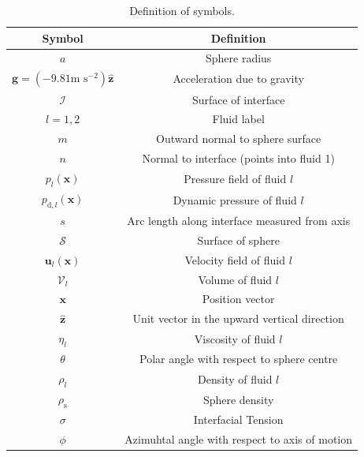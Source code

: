 \documentclass[12pt]{article}
\begin{document}
    \begin{longtable}{|c|c|}
    \caption{Definition of symbols. \label{tab:symbols}} \\ %
    \hline
    Symbol & Definition \\  
    \hline %
    $a$                                                    & Sphere radius           \\
    $\mathbf{g} = (-9.81 \text{m s}^{-2}) \mathbf{\hat{z}}$ & Acceleration due to gravity \\      
    $\mathcal{I}$                                          & Surface of interface \\
    $l = 1,2$                                              & Fluid label \\
    $m$                                                    & Outward normal to sphere surface \\
    $n$                                                    & Normal to interface (points into fluid 1) \\
    $p_{l}(\mathbf{x})$                                     & Pressure field of fluid $l$ \\
    $p_{\text{d},l}(\mathbf{x}) $                             & Dynamic pressure of fluid $l$ \\
    $s$                                                    & Arc length along interface measured from axis \\
    $\mathcal{S}$                                          & Surface of sphere \\
    $\mathbf{u}_{l}(\mathbf{x})$                            & Velocity field of fluid $l$ \\
    $\mathcal{V}_{l}$                                       & Volume of fluid $l$ \\
    $\mathbf{x}$                                           & Position vector \\
    $\mathbf{\hat{z}}$                                     & Unit vector in the upward vertical direction \\
    $\eta_{l}$                                              & Viscosity of fluid $l$ \\ 
    $\theta$                                               & Polar angle with respect to sphere centre \\
    $\rho_{l}$                                              & Density of fluid $l$   \\
    $\rho_{\text{s}}$                                         & Sphere density          \\
    $\sigma$                                               & Interfacial Tension     \\
    $\phi$                                                 & Azimuhtal angle with respect to axis of motion \\
    \hline %
  \end{longtable}


%

%
\end{document}
